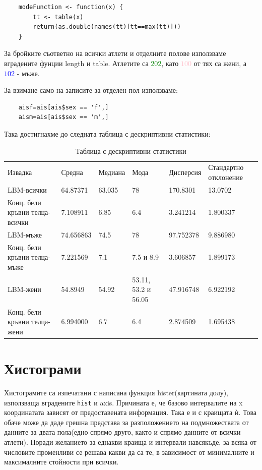 \documentclass[12pt]{article} %
\begin{document}
\begin{large}
\begin{verbatim}
	modeFunction <- function(x) {
		tt <- table(x)
		return(as.double(names(tt)[tt==max(tt)]))
	}
\end{verbatim}

За бройките съответно на всички атлети и отделните полове използваме вградените фунции length и table. Атлетите са \textcolor{green}{$202$}, като \textcolor{pink}{$100$} от тях са жени, а \textcolor{blue}{$102$} - мъже.

За взимане само на записите за отделен пол използваме:
\begin{verbatim}
	aisf=ais[ais$sex == 'f',]
	aism=ais[ais$sex == 'm',]
\end{verbatim}
Така достигнахме до следната таблица с дескриптивни статистики:
\clearpage

\begin{table}
\centering
\begin{tabular}{|L{3cm}|L{2.4cm}|L{2.4cm}|L{2.4cm}|L{2.4cm}|L{2.4cm}|}
 \hline 
 Извадка & Средна & Медиана & Мода  & Дисперсия & Стандартно отклонение\\
 LBM-всички & 64.87371 & 63.035 & 78 & 170.8301 & 13.0702 \\
 \hline
 Конц. бели кръвни телца-всички & 7.108911 & 6.85 & 6.4 & 3.241214 & 1.800337 \\
 \hline
 LBM-мъже & 74.656863 & 74.5 & 78 & 97.752378 & 9.886980 \\
 \hline
 Конц. бели кръвни телца-мъже & 7.221569 & 7.1 & 7.5 и 8.9 & 3.606857 & 1.899173 \\
 \hline
 LBM-жени & 54.8949 & 54.92 & 53.11, 53.2 и 56.05 & 47.916748 & 6.922192 \\
 \hline
 Конц. бели кръвни телца-жени & 6.994000 & 6.7 & 6.4 & 2.874509 & 1.695438 \\
 \hline
\end{tabular}
\caption{Таблица с дескриптивни статистики}
\end{table}

\section{Хистограми}
Хистограмите са изпечатани с написана функция hister(картината долу), използваща вградените \texttt{hist} и axis. Причината е, че базово интервалите на x координатата зависят от предоставената информация. Така е и с краищата ѝ. Това обаче може да даде грешна представа за разположението на подмножествата от данните за двата пола(едно спрямо друго, както и спрямо данните от всички атлети). Поради желанието за еднакви краища и интервали навсякъде, за всяка от числовите променливи се решава какви да са те, в зависимост от минималните и максималните стойности при всички. 


\end{large}
\end{document}
